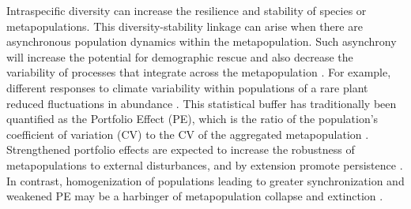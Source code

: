 \documentclass{revtex4}
\begin{document}
Intraspecific diversity can increase the resilience and stability of species or metapopulations. 
This diversity-stability linkage can arise when there are asynchronous population dynamics within the metapopulation. 
Such asynchrony will increase the potential for demographic rescue \citep{Brown:1977gk,Earn:2000fm} and also decrease the variability of processes that integrate across the metapopulation \citep{Anonymous:2015gf}. 
For example, different responses to climate variability within populations of a rare plant reduced fluctuations in abundance \citep{Abbott:2017hl}. 
This statistical buffer has traditionally been quantified as the Portfolio Effect (PE), which is the ratio of the population's coefficient of variation (CV) to the CV of the aggregated metapopulation \citep{Thibaut:2012km}. 
Strengthened portfolio effects are expected to increase the robustness of metapopulations to external disturbances, and by extension promote persistence \citep{Thibaut:2012km}.
In contrast, homogenization of populations leading to greater synchronization and weakened PE may be a harbinger of metapopulation collapse and extinction \citep{Carlson:2011ce}.
\end{document}
